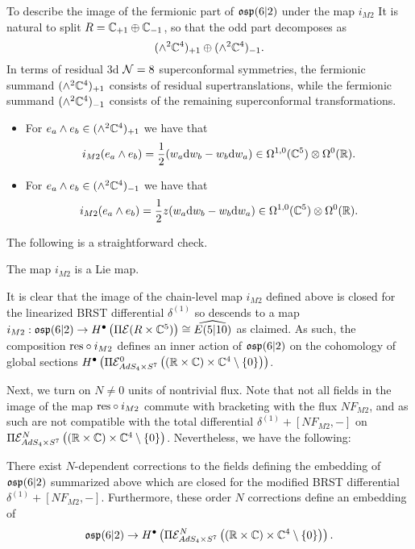 To describe the image of the fermionic part of $\mathfrak{osp}(6|2)$ under the map $i_{M2}$ It is natural to split $R = \mathbb{C}_{+1} \oplus \mathbb{C}_{-1}$, so that the odd part decomposes as
\[
(\wedge^2 \mathbb{C}^4)_{+1} \oplus (\wedge^2 \mathbb{C}^4)_{-1} .
\]
In terms of residual 3d $\mathcal{N}=8$ superconformal symmetries, the fermionic summand $(\wedge^2 \mathbb{C}^4)_{+1}$ consists of residual supertranslations, while the fermionic summand $(\wedge^2 \mathbb{C}^4)_{-1}$ consists of the remaining superconformal transformations. 

\begin{itemize}
\item 
For $e_a\wedge e_b\in (\wedge^2 \mathbb{C}^4)_{+1}$ we have that 
\[
i_{M2} (e_a\wedge e_b) = \frac{1}{2} (w_a \mathrm{d} w_b - w_b \mathrm{d} w_a) \in \Omega^{1,0}(\mathbb{C}^5) \otimes \Omega^0(\mathbb{R}) .
\] 
\item For $e_a\wedge e_b\in (\wedge^2 \mathbb{C}^4)_{-1}$ we have that 
\[
i_{M2} (e_a\wedge e_b) = \frac{1}{2} z (w_a \mathrm{d} w_b - w_b \mathrm{d} w_a) \in \Omega^{1,0}(\mathbb{C}^5) \otimes \Omega^0(\mathbb{R}). 
\] 
\end{itemize}

The following is a straightforward check.

\begin{lem}\label{lem:m2emb}
The map $i_{M2}$ is a Lie map.
\end{lem} 

It is clear that the image of the chain-level map $i_{M2}$ defined above is closed for the linearized BRST differential $\delta^{(1)}$ so descends to a map $i_{M2}: \mathfrak{osp}(6|2) \to H^\bullet \left ( \Pi \mathcal{E} (R\times \mathbb{C}^5)\right )\cong\widehat{E(5|10) }$ as claimed. As such, the composition $\mathrm{res}\circ i_{M2}$ defines an inner action of $\mathfrak{osp}(6|2)$ on the cohomology of global sections $H^\bullet \left ( \Pi \mathcal{E}^0_{AdS_4\times S^7} \left ( (\mathbb{R}\times \mathbb{C}) \times \mathbb{C}^4\setminus \{0\} \right ) \right )$. 

\parsec[]

Next, we turn on $N \ne 0$ units of nontrivial flux. Note that not all fields in the image of the map $\mathrm{res}\circ i_{M2}$ commute with bracketing with the flux $N F_{M2}$, and as such are not compatible with the total differential $\delta^{(1)} + [N F_{M2}, -]$ on $\Pi \mathcal{E}^N_{AdS_4\times S^7} \left ( (\mathbb{R}\times \mathbb{C}) \times \mathbb{C}^4\setminus \{0\} \right )$. Nevertheless, we have the following:

\begin{prop}
\label{prop:brads4}
There exist $N$-dependent corrections to the fields defining the embedding of $\mathfrak{osp}(6|2)$ summarized above which are closed for the modified BRST differential $\delta^{(1)} + [N F_{M2},-]$. 
Furthermore, these order $N$ corrections define an embedding of 
\[\mathfrak{osp}(6|2) \to H^\bullet \left ( \Pi \mathcal{E}^N_{AdS_4\times S^7} \left ( (\mathbb{R}\times \mathbb{C}) \times \mathbb{C}^4\setminus \{0\} \right ) \right ) .\]
\end{prop}

